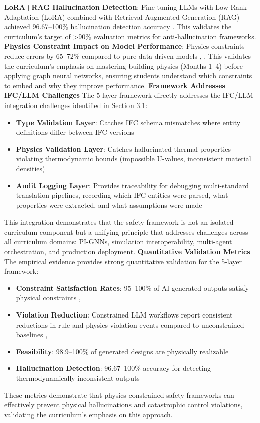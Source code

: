 \documentclass[12pt,a4paper]{article}
\begin{document}
\textbf{LoRA+RAG Hallucination Detection}: Fine-tuning LLMs with Low-Rank Adaptation (LoRA) combined with Retrieval-Augmented Generation (RAG) achieved 96.67--100\% hallucination detection accuracy \cite{ref170}. This validates the curriculum's target of >90\% evaluation metrics for anti-hallucination frameworks.
\textbf{Physics Constraint Impact on Model Performance}: Physics constraints reduce errors by 65--72\% compared to pure data-driven models \cite{ref162}, \cite{ref211}. This validates the curriculum's emphasis on mastering building physics (Months 1--4) before applying graph neural networks, ensuring students understand which constraints to embed and why they improve performance.
\textbf{Framework Addresses IFC/LLM Challenges}
The 5-layer framework directly addresses the IFC/LLM integration challenges identified in Section 3.1:
\begin{itemize}
  \item \textbf{Type Validation Layer}: Catches IFC schema mismatches where entity definitions differ between IFC versions
  \item \textbf{Physics Validation Layer}: Catches hallucinated thermal properties violating thermodynamic bounds (impossible U-values, inconsistent material densities) \cite{ref21}
  \item \textbf{Audit Logging Layer}: Provides traceability for debugging multi-standard translation pipelines, recording which IFC entities were parsed, what properties were extracted, and what assumptions were made
\end{itemize}
This integration demonstrates that the safety framework is not an isolated curriculum component but a unifying principle that addresses challenges across all curriculum domains: PI-GNNs, simulation interoperability, multi-agent orchestration, and production deployment.
\textbf{Quantitative Validation Metrics}
The empirical evidence provides strong quantitative validation for the 5-layer framework:
\begin{itemize}
  \item \textbf{Constraint Satisfaction Rates}: 95--100\% of AI-generated outputs satisfy physical constraints \cite{ref52}, \cite{ref56}
  \item \textbf{Violation Reduction}: Constrained LLM workflows report consistent reductions in rule and physics-violation events compared to unconstrained baselines \cite{ref56}, \cite{ref123}
  \item \textbf{Feasibility}: 98.9--100\% of generated designs are physically realizable \cite{ref52}
  \item \textbf{Hallucination Detection}: 96.67--100\% accuracy for detecting thermodynamically inconsistent outputs \cite{ref170}
\end{itemize}
These metrics demonstrate that physics-constrained safety frameworks can effectively prevent physical hallucinations and catastrophic control violations, validating the curriculum's emphasis on this approach.
\end{document}
